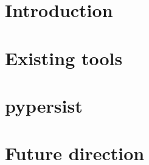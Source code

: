 \documentclass{deliverablereport}
\author{Michael Torpey}
\begin{document}
\maketitle
\githubissuedescription


\section{Introduction}
\label{sec:intro}


\section{Existing tools}
\label{sec:existing}


\section{pypersist}
\label{sec:pypersist}



\section{Future direction}
\label{sec:future}

\end{document}
